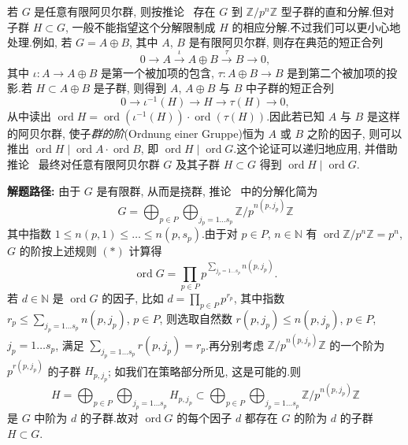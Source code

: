 若 $G$ 是任意有限阿贝尔群, 则按推论~ 存在 $G$ 到 $\mathbb{Z}/p^n \mathbb{Z}$ 型子群的直和分解.但对子群 $H \subset G$, 一般不能指望这个分解限制成 $H$ 的相应分解.不过我们可以更小心地处理.例如, 若 $G = A \oplus B$, 其中 $A$, $B$ 是有限阿贝尔群, 则存在典范的短正合列
\[
0 \longrightarrow A \xrightarrow{\iota} A \oplus B \xrightarrow{\tau} B \longrightarrow 0,
\]
其中 $\iota \colon A \longrightarrow A \oplus B$ 是第一个被加项的包含, $\tau \colon A \oplus B \longrightarrow B$ 是到第二个被加项的投影.若 $H \subset A \oplus B$ 是子群, 则得到 $A$, $A \oplus B$ 与 $B$ 中子群的短正合列
\[
0 \longrightarrow \iota^{-1}(H) \longrightarrow H \longrightarrow \tau(H) \longrightarrow 0,
\]
从中读出 $\operatorname{ord} H = \operatorname{ord}(\iota^{-1}(H)) \cdot \operatorname{ord}(\tau(H))$.因此若已知 $A$ 与 $B$ 是这样的阿贝尔群, 使子\emph{群的阶}(\textup{Ordnung einer Gruppe})恒为 $A$ 或 $B$ 之阶的因子, 则可以推出 $\operatorname{ord} H \mid \operatorname{ord} A \cdot \operatorname{ord} B$, 即 $\operatorname{ord} H \mid \operatorname{ord} G$.这个论证可以递归地应用, 并借助推论~ 最终对任意有限阿贝尔群 $G$ 及其子群 $H \subset G$ 得到 $\operatorname{ord} H \mid \operatorname{ord} G$.

\noindent\textbf{解题路径:} 由于 $G$ 是有限群, 从而是挠群, 推论~ 中的分解化简为
\[
G = \bigoplus_{p \in P} \bigoplus_{j_p = 1 \ldots s_p} \mathbb{Z}/p^{n(p, j_p)} \mathbb{Z}
\]
其中指数 $1 \leq n(p, 1) \leq \ldots \leq n(p, s_p)$.由于对 $p \in P$, $n \in \mathbb{N}$ 有 $\operatorname{ord} \mathbb{Z}/p^n \mathbb{Z} = p^n$, $G$ 的阶按上述规则 $(*)$ 计算得
\[
\operatorname{ord} G = \prod_{p \in P} p^{\sum_{j_p = 1 \ldots s_p} n(p, j_p)}\text{.}
\]
若 $d \in \mathbb{N}$ 是 $\operatorname{ord} G$ 的因子, 比如 $d = \prod_{p \in P} p^{r_p}$, 其中指数 $r_p \leq \sum_{j_p = 1 \ldots s_p} n(p, j_p)$, $p \in P$, 则选取自然数 $r(p, j_p) \leq n(p, j_p)$, $p \in P$, $j_p = 1 \ldots s_p$, 满足 $\sum_{j_p = 1 \ldots s_p} r(p, j_p) = r_p$.再分别考虑 $\mathbb{Z}/p^{n(p, j_p)} \mathbb{Z}$ 的一个阶为 $p^{r(p, j_p)}$ 的子群 $H_{p, j_p}$; 如我们在策略部分所见, 这是可能的.则
\[
H = \bigoplus_{p \in P} \bigoplus_{j_p = 1 \ldots s_p} H_{p, j_p} \subset \bigoplus_{p \in P} \bigoplus_{j_p = 1 \ldots s_p} \mathbb{Z}/p^{n(p, j_p)} \mathbb{Z}
\]
是 $G$ 中阶为 $d$ 的子群.故对 $\operatorname{ord} G$ 的每个因子 $d$ 都存在 $G$ 的阶为 $d$ 的子群 $H \subset G$.


